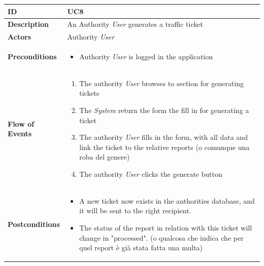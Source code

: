 





\begin{table}[H]
\begin{tabular}{|l|p{}|}
\hline
\textbf{ID}             & UC8                                                                           \\ \hline
\textbf{Description}    & An Authority \textit{User} generates a traffic ticket \\ \hline
\textbf{Actors}         &  Authority \textit{User}                                                                       \\ \hline

\textbf{Preconditions}  &   \begin{itemize}

 \item Authority \textit{User} is logged in the application
                 \end{itemize}     
                    \\ \hline
                    
\textbf{Flow of Events} &   \begin{enumerate}
    \item The authority \textit{User} browses to section for generating tickets
    \item The \textit{System} return the form the fill in for generating a ticket
    \item The authority \textit{User} fills in the form, with all data and link the ticket to the relative reports (o comunque una roba del genere)
    \item The authority \textit{User} clicks the generate button

\end{enumerate}                                                                             \\ \hline
\textbf{Postconditions} & \begin{itemize}
     
 \item A new ticket now exists in the authorities database, and it will be sent to the right recipient.
 \item The status of the report in relation with this ticket will change in "processed". (o qualcosa che indica che per quel report è già stata fatta una multa)
 \end{itemize}\\ \hline


\end{tabular}
\end{table}
